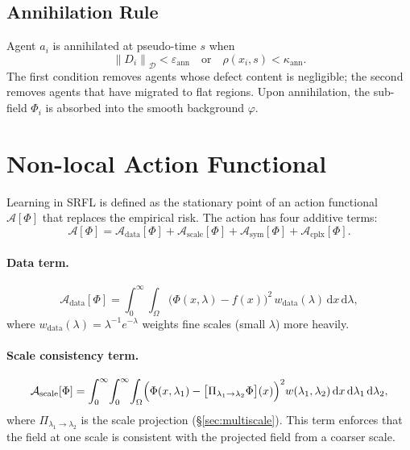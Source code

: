 \documentclass[12pt,a4paper]{article}
\theoremstyle{plain}
\theoremstyle{definition}
\theoremstyle{remark}
\newcommand{\cD}{\mathcal{D}}
\newcommand{\cA}{\mathcal{A}}
\newcommand{\norm}[1]{\left\|#1\right\|}
\newcommand{\dd}{\mathrm{d}}
\newcommand{\eps}{\varepsilon}
\begin{document}
\subsection{Annihilation Rule}

Agent $a_i$ is annihilated at pseudo-time $s$ when
\begin{equation}
  \norm{D_i}_\cD < \eps_\text{ann}
  \quad\text{or}\quad
  \rho(x_i, s) < \kappa_\text{ann}.
  \label{eq:annihilation}
\end{equation}
The first condition removes agents whose defect content is negligible;
the second removes agents that have migrated to flat regions.
Upon annihilation, the sub-field $\Phi_i$ is absorbed into the smooth
background $\varphi$.

\section{Non-local Action Functional}
\label{sec:action}

Learning in SRFL is defined as the stationary point of an action
functional $\cA[\Phi]$ that replaces the empirical risk.  The action
has four additive terms:
\begin{equation}
  \cA[\Phi]
  = \cA_\text{data}[\Phi]
  + \cA_\text{scale}[\Phi]
  + \cA_\text{sym}[\Phi]
  + \cA_\text{cplx}[\Phi].
  \label{eq:action_total}
\end{equation}

\paragraph{Data term.}
\begin{equation}
  \cA_\text{data}[\Phi]
  = \int_0^\infty \!\int_\Omega
    \bigl(\Phi(x,\lambda) - f(x)\bigr)^2\,
    w_\text{data}(\lambda)\,\dd x\,\dd\lambda,
  \label{eq:action_data}
\end{equation}
where $w_\text{data}(\lambda) = \lambda^{-1}e^{-\lambda}$ weights fine
scales (small $\lambda$) more heavily.

\paragraph{Scale consistency term.}
\begin{equation}
  \cA_\text{scale}[\Phi]
  = \int_0^\infty\!\int_0^\infty\!\int_\Omega
    \Bigl(\Phi(x,\lambda_1)
          - \bigl[\Pi_{\lambda_1\to\lambda_2}\Phi\bigr](x)\Bigr)^2
    w(\lambda_1,\lambda_2)\,\dd x\,\dd\lambda_1\,\dd\lambda_2,
  \label{eq:action_scale}
\end{equation}
where $\Pi_{\lambda_1\to\lambda_2}$ is the scale projection
(\S\ref{sec:multiscale}).  This term enforces that the field at one
scale is consistent with the projected field from a coarser scale.
\end{document}
